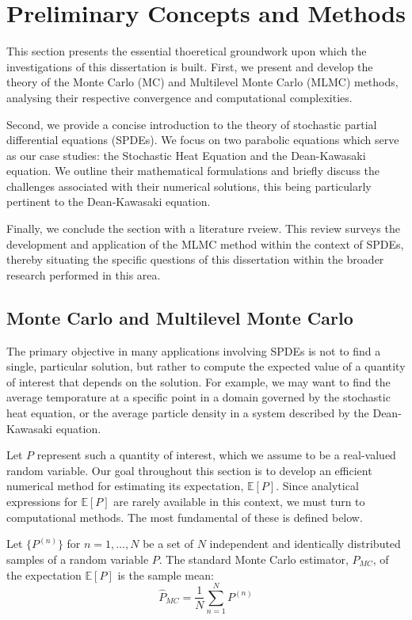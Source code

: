 \section{Preliminary Concepts and Methods}


This section presents the essential thoeretical groundwork upon which the
investigations of this dissertation is built. First, we present and develop the theory 
of the Monte Carlo (MC) and Multilevel Monte Carlo (MLMC) methods, analysing their 
respective convergence and computational complexities. 

Second, we provide a concise introduction to the theory of stochastic partial differential 
equations (SPDEs). We focus on two parabolic equations which serve as our case studies: 
the Stochastic Heat Equation and the Dean-Kawasaki equation. We outline 
their mathematical formulations and briefly discuss the challenges 
associated with their numerical solutions, this being particularly pertinent to 
the Dean-Kawasaki equation.

Finally, we conclude the section with a literature rveiew. This review surveys the 
development and application of the MLMC method within the context of SPDEs, 
thereby situating the specific questions of this dissertation within the broader
research performed in this area.


\subsection{Monte Carlo and Multilevel Monte Carlo}

The primary objective in many applications involving SPDEs is not to find 
a single, particular solution, but rather to compute the expected value of a quantity of 
interest that depends on the solution. For example, we may 
want to find the average temporature at a specific point in a domain 
governed by the stochastic heat equation, or the average particle density in a
system described by the Dean-Kawasaki equation.

Let $P$ represent such a quantity of interest, which we assume to be a real-valued 
random variable. Our goal throughout this section is to develop an efficient numerical
method for estimating its expectation, $\mathbb{E}[P]$. Since 
analytical expressions for $\mathbb{E}[P]$ are rarely available in this context, we must 
turn to computational methods. The most fundamental of these is defined below.

\begin{definition}\label{def:mc_estimator}
    Let $\{P^{(n)}\}$ for $n = 1, \dots, N$ be a set of $N$ independent and identically
    distributed samples of a random variable $P$. The standard Monte Carlo estimator,
    $\hat{P}_{MC}$, of the expectation $\mathbb{E}[P]$ is the sample mean:
    \[
    \hat{P}_{MC} = \frac{1}{N} \sum_{n=1}^N P^{(n)}
    \]
\end{definition}

